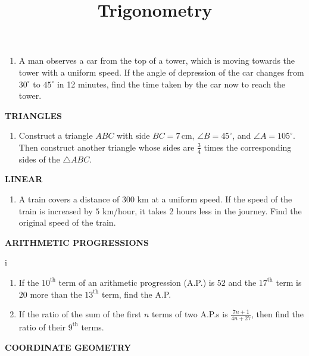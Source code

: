 \documentclass{article}
\title{Trigonometry}
\date{}
\begin{document}
\maketitle

\begin{enumerate}
    \item A man observes a car from the top of a tower, which is moving towards the tower with a uniform speed. If the angle of depression of the car changes from $30^\circ$ to $45^\circ$ in 12 minutes, find the time taken by the car now to reach the tower.
\end{enumerate}

\begin{center}
\textbf{TRIANGLES}
\end{center}

\begin{enumerate}
    \item Construct a triangle $ABC$ with side $BC = 7\, \text{cm}$, $\angle B = 45^\circ$, and $\angle A = 105^\circ$. Then construct another triangle whose sides are $\frac{3}{4}$ times the corresponding sides of the $\triangle ABC$.
\end{enumerate}

\begin{center}
\textbf{LINEAR}
\end{center}

\begin{enumerate}
    \item A train covers a distance of $300$ km at a uniform speed. If the speed of the train is increased by $5$ km/hour, it takes 2 hours less in the journey. Find the original speed of the train.
\end{enumerate}

\begin{center}
\textbf{ARITHMETIC PROGRESSIONS}
\end{center}

i\begin{enumerate}
    \item If the $10^\text{th}$ term of an arithmetic progression (A.P.) is $52$ and the $17^\text{th}$ term is $20$ more than the $13^\text{th}$ term, find the A.P.
    \item If the ratio of the sum of the first $n$ terms of two A.P.s is $\frac{7n + 1}{4n + 27}$, then find the ratio of their $9^\text{th}$ terms.
\end{enumerate}

\begin{center}
\textbf{COORDINATE GEOMETRY}
\end{center}
\end{document}
